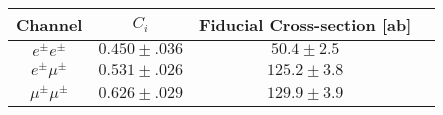 \begin{tabular}{|c||c|c|c|}
\hline
 Channel & $C_i$   & Fiducial Cross-section [ab]\\
\hline\hline
$e^\pm e^\pm$ &  $0.450 \pm .036$ & $50.4 \pm 2.5$\\
$e^\pm \mu^\pm$ &  $0.531 \pm .026$ & $125.2 \pm 3.8$\\
$\mu^\pm \mu^\pm$ &  $0.626 \pm .029$ & $129.9  \pm 3.9$ \\
\hline
\end{tabular}

